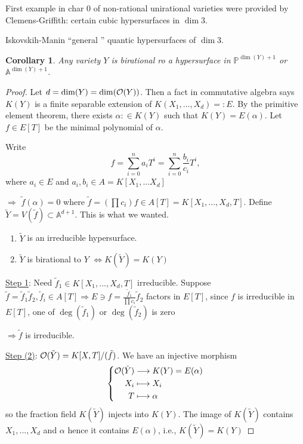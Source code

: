 \documentclass[11pt]{article}
\newtheorem{cor}[thm]{Corollary}
\newcommand{\affn}{\mathbb A}
\newcommand{\proj}{\mathbb P}
\newcommand{\calo}{{\cal O}}
\newcommand{\Lrta}{\Longrightarrow}
\newcommand{\lrta}{\longrightarrow}
\newcommand{\Llrta}{\Longleftrightarrow}
\begin{document}
First example in char $0$ of non-rational unirational varieties were provided by Clemens-Griffith: certain cubic hypersurfaces in $\dim 3$. 

Iskovskih-Manin ``general '' quantic hypersurfaces of $\dim 3$.

\begin{cor}
Any variety $Y$ is birational ro a hypersurface in $\proj^{\dim(Y)+1}$ or $\affn^{\dim(Y)+1}$.
\end{cor}
\begin{proof}
Let $d=\dim(Y)=\dim(\calo(Y))$. Then a fact in commutative algebra says $K(Y)$ is a finite separable extension of $K(X_1,...,X_d)=:E$. By the primitive element theorem, there exists $\alpha:\in K(Y)$ such that  $K(Y)=E(\alpha)$. Let $f\in E[T]$ be the minimal polynomial of $\alpha$.

Write
$$
f=\sum_{i=0}^na_i T^i=\sum_{i=0}^n \frac{b_i}{c_i} T^i,
$$
where $a_i\in E$ and $a_i, b_i\in A=K[X_1,...X_d]$

$\Lrta$ $\tilde{f}(\alpha)=0$ where $\tilde{f}=\left(\prod c_i\right)f\in A[T]=K[X_1,...,X_d,T]$. Define $\tilde{Y}=V(\tilde{f})\subset \affn^{d+1}$. This is what we wanted.
\begin{enumerate}[label=(\arabic*)]
\item $\tilde{Y}$ is an irreducible hypersurface.
\item $\tilde{Y}$ is birational to $Y$ $\Llrta K(\tilde{Y})=K(Y)$
\end{enumerate}

\underline{Step 1}: Need $\tilde{f}_1\in K[X_1,...,X_d,T]$ irreducible. Suppose $\tilde{f}=\tilde{f}_1\tilde{f}_2, \tilde{f}_i\in A[T]\Lrta E\ni f=\frac{\tilde{f}_1}{\prod c_i}\tilde{f}_2 $ factors in $E[T]$, since $f$ is irreducible in  $E[T]$, one of $\deg(\tilde{f}_1)$ or $\deg(\tilde{f}_2)$ is zero

$\Lrta \tilde{f}$ is irreducible.

\underline{Step (2)}: $\calo(\tilde{Y})=K[X,T]/(\tilde{f})$. We have an injective morphism
$$
\left\{\begin{aligned}
 \calo(\tilde{Y})&\lrta K(Y)=E(\alpha)\\
 X_i&\longmapsto X_i\\
 T&\longmapsto \alpha
\end{aligned}
\right.
$$
so the fraction field $K(\tilde{Y})$ injects into $K(Y)$. The image of $K(\tilde{Y})$ contains $X_1,...,X_d$ and $\alpha$ hence it contains $E(\alpha)$, i.e., $K(\tilde{Y})=K(Y)$
\end{proof}
\end{document}
